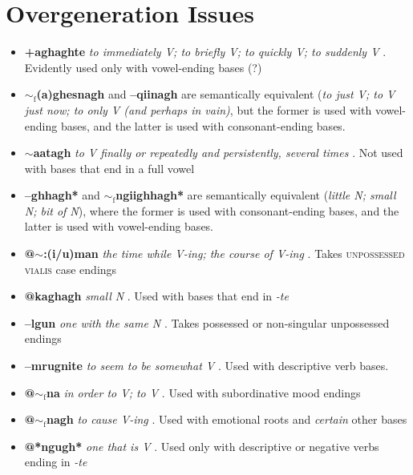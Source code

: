 \documentclass{article}
\begin{document}
\section{Overgeneration Issues}
\begin{itemize}
\item \textbf{+aghaghte} \textit{to immediately V; to briefly V; to quickly V; to suddenly V} . Evidently used only with vowel-ending bases (?)

\item \textbf{$\sim_\text{f}$(a)ghesnagh} and \textbf{–qiinagh} are semantically equivalent (\textit{to just V; to V just now; to only V (and perhaps in vain)}, but the former is used with vowel-ending bases, and the latter is used with consonant-ending bases.

\item \textbf{$\sim$aatagh} \textit{to V finally or repeatedly and persistently, several times} . Not used with bases that end in a full vowel

\item \textbf{--ghhagh*} and \textbf{$\sim_\text{f}$ngiighhagh*} are semantically equivalent (\textit{little N; small N; bit of N}), where the former is used with consonant-ending bases, and the latter is used with vowel-ending bases.

\item \textbf{@$\sim$:(i/u)man} \textit{the time while V-ing; the course of V-ing} . Takes \textsc{unpossessed vialis} case endings

\item \textbf{@kaghagh} \textit{small N} . Used with bases that end in \textit{-te}

\item \textbf{--lgun} \textit{one with the same N} . Takes possessed or non-singular unpossessed endings

\item \textbf{--mrugnite} \textit{to seem to be somewhat V} . Used with descriptive verb bases.

\item \textbf{@$\sim_\text{f}$na} \textit{in order to V; to V} . Used with subordinative mood endings

\item \textbf{@$\sim_\text{f}$nagh} \textit{to cause V-ing} . Used with emotional roots and \textit{certain} other bases

\item \textbf{@*ngugh*} \textit{one that is V} . Used only with descriptive or negative verbs ending in \textit{-te}


\end{itemize}
\end{document}
